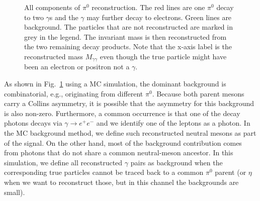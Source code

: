 \begin{figure}[t]
  \centering     
  \caption[Monte Carlo decomposition of the invariant-mass distribution around the $\pi^{0}$ mass]{All components of $\pi^0$ reconstruction. The red lines are one $\pi^0$ decay to two $\gamma$s and the $\gamma$ may further decay to electrons. Green lines are background. The particles that are not reconstructed are marked in grey in the legend. The invariant mass is then reconstructed from the two remaining decay products. Note that the x-axis label is the reconstructed mass $M_{\gamma\gamma}$ even though the true particle might have been an electron or positron not a $\gamma$.}
  \label{fig:pi0_component}
\end{figure}

As shown in Fig.~\ref{fig:pi0_component} using a MC simulation, the dominant background is combinatorial, e.g., originating from different $\pi^0$. Because both parent mesons carry a Collins asymmetry, it is possible that the asymmetry for this background is also non-zero. Furthermore, a common occurrence is that one of the decay photons decays via $\gamma \rightarrow e^+e^-$ and we identify one of the leptons as a photon. In the MC background method, we define such reconstructed neutral mesons as part of the signal. On the other hand, most of the background contribution comes from photons that do not share a common neutral-meson ancestor. In this simulation, we define all reconstructed $\gamma$ pairs as background when the corresponding true particles cannot be traced back to a common $\pi^0$ parent (or $\eta$ when we want to reconstruct those, but in this channel the backgrounds are small). 


